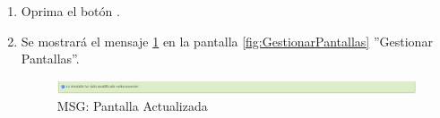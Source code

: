 \begin{enumerate}
			\item Oprima el botón \IUAceptar.
			
			\item Se mostrará el mensaje \ref{fig:pantallaModificada} en la pantalla \ref{fig:GestionarPantallas} ''Gestionar Pantallas''.
			
			\begin{figure}[htbp!]
				\begin{center}
					\includegraphics[scale=0.5]{roles/lider/pantallas/pantallas/IU11-2MSG1}
					\caption{MSG: Pantalla Actualizada}
					\label{fig:pantallaModificada}
				\end{center}
			\end{figure}
			\end{enumerate}
